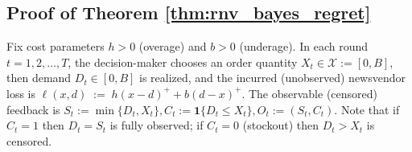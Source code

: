 \documentclass[11pt]{article}
\providecommand{\cX}{\mathcal{X}}
\begin{document}
\subsection{Proof of Theorem \ref{thm:rnv_bayes_regret}}
\label{app:proof_thm_ts_newsvendor}



Fix cost parameters \(h>0\) (overage) and \(b>0\) (underage). In each round \(t=1,2,\dots,T\), the decision-maker chooses an order quantity \(X_t \in \cX := [0,B]\), then demand \(D_t \in [0,B]\) is realized, and the incurred (unobserved) newsvendor loss is \(\ell(x,d) \;:=\; h(x-d)^+ + b(d-x)^+.\) The observable (censored) feedback is
\(
S_t := \min\{D_t,X_t\}, C_t := \mathbf{1}\{D_t \le X_t\}, O_t := (S_t,C_t).
\)
Note that if \(C_t=1\) then \(D_t=S_t\) is fully observed; if \(C_t=0\) (stockout) then \(D_t>X_t\) is censored.
\end{document}
